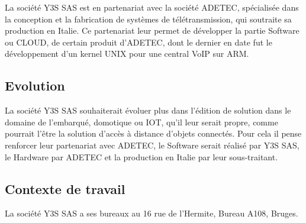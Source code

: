 La société Y3S SAS est en partenariat avec la société ADETEC, spécialisée dans la conception et la fabrication de systèmes de télétransmission, qui soutraite sa production en Italie. Ce partenariat leur permet de développer la partie \og Software \fg{} ou CLOUD, de certain produit d'ADETEC, dont le dernier en date fut le développement d'un kernel UNIX pour une central VoIP sur ARM.

\subsection{Evolution}

La société Y3S SAS souhaiterait évoluer plus dans l'édition de solution dans le domaine de l'embarqué, domotique ou IOT, qu'il leur serait propre, comme pourrait l'être la solution d'accès à distance d'objets connectés. Pour cela il pense renforcer leur partenariat avec ADETEC, le \og Software \fg{} serait réalisé par Y3S SAS, le \og Hardware \fg{} par ADETEC et la production en Italie par leur sous-traitant.

\subsection{Contexte de travail}

La société Y3S SAS a ses bureaux au 16 rue de l'Hermite, Bureau A108, Bruges.

